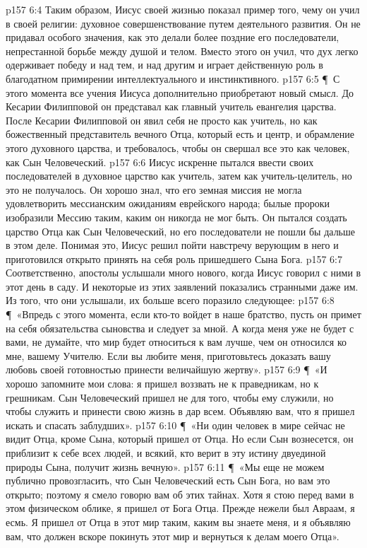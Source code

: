\vs p157 6:4 Таким образом, Иисус своей жизнью показал пример того, чему он учил в своей религии: духовное совершенствование путем деятельного развития. Он не придавал особого значения, как это делали более поздние его последователи, непрестанной борьбе между душой и телом. Вместо этого он учил, что дух легко одерживает победу и над тем, и над другим и играет действенную роль в благодатном примирении интеллектуального и инстинктивного.
\vs p157 6:5 \P\ С этого момента все учения Иисуса дополнительно приобретают новый смысл. До Кесарии Филипповой он представал как главный учитель евангелия царства. После Кесарии Филипповой он явил себя не просто как учитель, но как божественный представитель вечного Отца, который есть и центр, и обрамление этого духовного царства, и требовалось, чтобы он свершал все это как человек, как Сын Человеческий.
\vs p157 6:6 Иисус искренне пытался ввести своих последователей в духовное царство как учитель, затем как учитель\hyp{}целитель, но это не получалось. Он хорошо знал, что его земная миссия не могла удовлетворить мессианским ожиданиям еврейского народа; былые пророки изобразили Мессию таким, каким он никогда не мог быть. Он пытался создать царство Отца как Сын Человеческий, но его последователи не пошли бы дальше в этом деле. Понимая это, Иисус решил пойти навстречу верующим в него и приготовился открыто принять на себя роль пришедшего Сына Бога.
\vs p157 6:7 Соответственно, апостолы услышали много нового, когда Иисус говорил с ними в этот день в саду. И некоторые из этих заявлений показались странными даже им. Из того, что они услышали, их больше всего поразило следующее:
\vs p157 6:8 \P\ «Впредь с этого момента, если кто\hyp{}то войдет в наше братство, пусть он примет на себя обязательства сыновства и следует за мной. А когда меня уже не будет с вами, не думайте, что мир будет относиться к вам лучше, чем он относился ко мне, вашему Учителю. Если вы любите меня, приготовьтесь доказать вашу любовь своей готовностью принести величайшую жертву».
\vs p157 6:9 \P\ «И хорошо запомните мои слова: я пришел воззвать не к праведникам, но к грешникам. Сын Человеческий пришел не для того, чтобы ему служили, но чтобы служить и принести свою жизнь в дар всем. Объявляю вам, что я пришел искать и спасать заблудших».
\vs p157 6:10 \P\ «Ни один человек в мире сейчас не видит Отца, кроме Сына, который пришел от Отца. Но если Сын вознесется, он приблизит к себе всех людей, и всякий, кто верит в эту истину двуединой природы Сына, получит жизнь вечную».
\vs p157 6:11 \P\ «Мы еще не можем публично провозгласить, что Сын Человеческий есть Сын Бога, но вам это открыто; поэтому я смело говорю вам об этих тайнах. Хотя я стою перед вами в этом физическом облике, я пришел от Бога Отца. Прежде нежели был Авраам, я есмь. Я пришел от Отца в этот мир таким, каким вы знаете меня, и я объявляю вам, что должен вскоре покинуть этот мир и вернуться к делам моего Отца».
